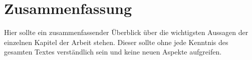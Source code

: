 \chapter{Zusammenfassung}
Hier sollte ein zusammenfassender Überblick über die wichtigsten Aussagen der einzelnen Kapitel der Arbeit stehen. Dieser sollte ohne jede Kenntnis des gesamten Textes verständlich sein und keine neuen Aspekte aufgreifen.